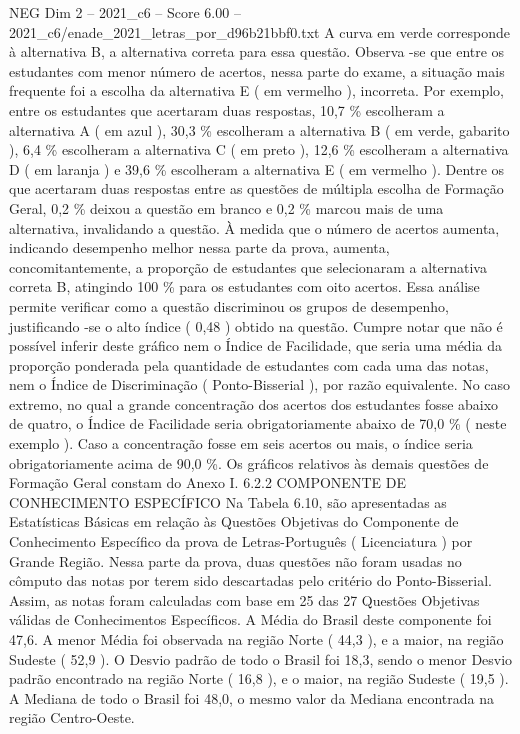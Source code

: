 \begin{textsample}{NEG Dim 2 – 2021\_c6 – Score 6.00 – 2021\_c6/enade\_2021\_letras\_por\_d96b21bbf0.txt}
A curva em verde corresponde à alternativa B, a alternativa correta para essa questão.
Observa -se que entre os estudantes com menor número de acertos, nessa parte do exame, a situação mais frequente foi a escolha da alternativa E ( em vermelho ), incorreta.
Por exemplo, entre os estudantes que acertaram duas respostas, 10,7 \% escolheram a alternativa A ( em azul ), 30,3 \% escolheram a alternativa B ( em verde, gabarito ), 6,4 \% escolheram a alternativa C ( em preto ), 12,6 \% escolheram a alternativa D ( em laranja ) e 39,6 \% escolheram a alternativa E ( em vermelho ).
Dentre os que acertaram duas respostas entre as questões de múltipla escolha de Formação Geral, 0,2 \% deixou a questão em branco e 0,2 \% marcou mais de uma alternativa, invalidando a questão.
À medida que o número de acertos aumenta, indicando desempenho melhor nessa parte da prova, aumenta, concomitantemente, a proporção de estudantes que selecionaram a alternativa correta B, atingindo 100 \% para os estudantes com oito acertos.
Essa análise permite verificar como a questão discriminou os grupos de desempenho, justificando -se o alto índice ( 0,48 ) obtido na questão.
Cumpre notar que não é possível inferir deste gráfico nem o Índice de Facilidade, que seria uma média da proporção ponderada pela quantidade de estudantes com cada uma das notas, nem o Índice de Discriminação ( Ponto-Bisserial ), por razão equivalente.
No caso extremo, no qual a grande concentração dos acertos dos estudantes fosse abaixo de quatro, o Índice de Facilidade seria obrigatoriamente abaixo de 70,0 \% ( neste exemplo ).
Caso a concentração fosse em seis acertos ou mais, o índice seria obrigatoriamente acima de 90,0 \%.
Os gráficos relativos às demais questões de Formação Geral constam do Anexo I. 6.2.2 COMPONENTE DE CONHECIMENTO ESPECÍFICO Na Tabela 6.10, são apresentadas as Estatísticas Básicas em relação às Questões Objetivas do Componente de Conhecimento Específico da prova de Letras-Português ( Licenciatura ) por Grande Região.
Nessa parte da prova, duas questões não foram usadas no cômputo das notas por terem sido descartadas pelo critério do Ponto-Bisserial.
Assim, as notas foram calculadas com base em 25 das 27 Questões Objetivas válidas de Conhecimentos Específicos.
A Média do Brasil deste componente foi 47,6.
A menor Média foi observada na região Norte ( 44,3 ), e a maior, na região Sudeste ( 52,9 ).
O Desvio padrão de todo o Brasil foi 18,3, sendo o menor Desvio padrão encontrado na região Norte ( 16,8 ), e o maior, na região Sudeste ( 19,5 ).
A Mediana de todo o Brasil foi 48,0, o mesmo valor da Mediana encontrada na região Centro-Oeste.

\end{textsample}
